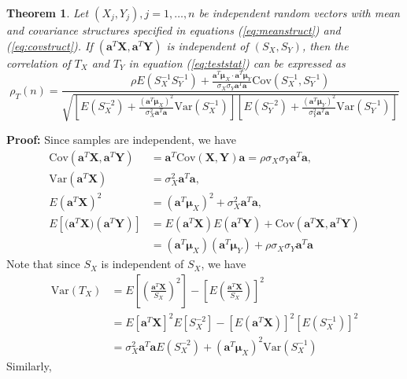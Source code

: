 \documentclass[12pt, a4paper]{article}
\newtheorem{theorem}{Theorem}       %
\newcommand{\cov}{\text{Cov}}
\newcommand{\var}{\text{Var}}
\begin{document}
	\begin{theorem}\label{thm:teststatcor}
		Let $(X_j, Y_j), j = 1, \ldots, n$ be independent random vectors with mean and covariance structures specified in equations (\ref{eq:meanstruct}) and (\ref{eq:covstruct}). If $(\bm a^T\bm X, \bm a^T\bm Y)$ is independent of $(S_X, S_Y)$, then the correlation of $T_X$ and $T_Y$ in equation (\ref{eq:teststat}) can be expressed as 
		\begin{equation}\label{eq:teststatcor}
			\rho_T(n) = \frac{ \rho E(S_X^{-1}S_Y^{-1}) + \frac{\bm a^T\bm \mu_X\cdot \bm a^T\bm \mu_Y}{\sigma_X\sigma_Y\bm a^T\bm a}\cov(S_X^{-1}, S_Y^{-1}) }{\sqrt{\left[E(S_X^{-2}) + \frac{(\bm a^T\bm \mu_X)^2}{\sigma_X^2\bm a^T\bm a}\var(S_X^{-1})\right]\left[E(S_Y^{-2}) + \frac{(\bm a^T\bm \mu_Y)^2}{\sigma_Y^2\bm a^T\bm a}\var(S_Y^{-1})\right]}}
		\end{equation}
	\end{theorem}
	\textbf{Proof:} Since samples are independent, we have 
	\begin{equation}\label{eq:testprepare}
	\begin{aligned}
		\cov(\bm a^T\bm X, \bm a^T\bm Y) &= \bm a^T \cov(\bm X, \bm Y)\bm a  = \rho\sigma_X\sigma_Y\bm a^T\bm a, \\
		\var(\bm a^T\bm X)&  = \sigma_X^2\bm a^T\bm a, \\
		 E(\bm a^T\bm X)^2& =(\bm a^T\bm \mu_X)^2 + \sigma_X^2\bm a^T\bm a, \\
		E[\bm (\bm a^T\bm X)(\bm a^T\bm Y)] &=E(\bm a^T\bm X)E(\bm a^T\bm Y) + \cov(\bm a^T\bm X, \bm a^T\bm Y)  	\\& = (\bm a^T\bm \mu_X)(\bm a^T\bm \mu_Y) + \rho \sigma_X\sigma_Y\bm a^T\bm a
	\end{aligned}
	\end{equation}
	Note that since $S_X$ is independent of $S_X$, we have 
	\begin{equation}\label{eq:testdenom1}
	\begin{aligned}
		\var(T_X) &= E\left[\left(\frac{\bm a^T\bm X}{S_X}\right)^2\right] - \left[E\left(\frac{\bm a^T\bm X}{S_X}\right)\right]^2\\
		& = E[\bm a^T\bm X]^2E[S_X^{-2}] - \left[E(\bm a^T\bm X)\right]^2\left[E(S_X^{-1})\right]^2\\
		& = \sigma_X^2\bm a^T\bm a E(S_X^{-2}) + (\bm a^T\bm \mu_X)^2\var(S_X^{-1})
	\end{aligned}
	\end{equation}
	Similarly, 
\end{document}
